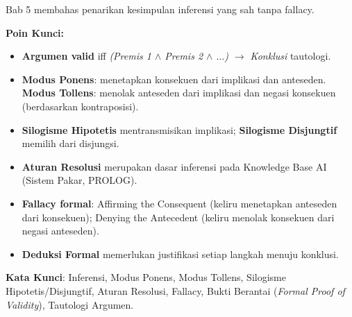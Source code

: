 \documentclass[../main]{subfiles}
\begin{document}

\begin{rangkuman}
Bab 5 membahas penarikan kesimpulan inferensi yang sah tanpa fallacy.

\textbf{Poin Kunci:}
\begin{itemize}
  \item \textbf{Argumen valid} iff \textit{(Premis 1 $\land$ Premis 2 $\land$ $\ldots$) $\rightarrow$ Konklusi} tautologi.
  \item \textbf{Modus Ponens}: menetapkan konsekuen dari implikasi dan anteseden. \textbf{Modus Tollens}: menolak anteseden dari implikasi dan negasi konsekuen (berdasarkan kontraposisi).
  \item \textbf{Silogisme Hipotetis} mentransmisikan implikasi; \textbf{Silogisme Disjungtif} memilih dari disjungsi.
  \item \textbf{Aturan Resolusi} merupakan dasar inferensi pada Knowledge Base AI (Sistem Pakar, PROLOG).
  \item \textbf{Fallacy formal}: Affirming the Consequent (keliru menetapkan anteseden dari konsekuen); Denying the Antecedent (keliru menolak konsekuen dari negasi anteseden).
  \item \textbf{Deduksi Formal} memerlukan justifikasi setiap langkah menuju konklusi.
\end{itemize}

\textbf{Kata Kunci}: Inferensi, Modus Ponens, Modus Tollens, Silogisme Hipotetis/Disjungtif, Aturan Resolusi, Fallacy, Bukti Berantai (\textit{Formal Proof of Validity}), Tautologi Argumen.
\end{rangkuman}

\ifSubfilesClassLoaded{
  \renewcommand{\bibname}{Daftar Pustaka}
  
  
}{}
\end{document}
